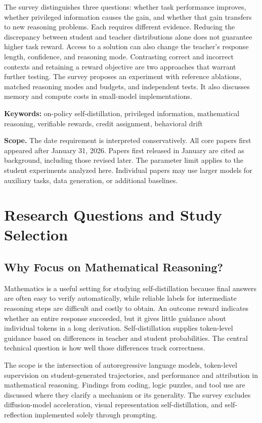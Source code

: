 \documentclass[11pt,a4paper]{article}
\begin{document}
The survey distinguishes three questions: whether task performance improves, whether privileged information causes the gain, and whether that gain transfers to new reasoning problems. Each requires different evidence. Reducing the discrepancy between student and teacher distributions alone does not guarantee higher task reward. Access to a solution can also change the teacher's response length, confidence, and reasoning mode. Contrasting correct and incorrect contexts and retaining a reward objective are two approaches that warrant further testing. The survey proposes an experiment with reference ablations, matched reasoning modes and budgets, and independent tests. It also discusses memory and compute costs in small-model implementations.

\noindent\textbf{Keywords:} on-policy self-distillation, privileged information, mathematical reasoning, verifiable rewards, credit assignment, behavioral drift

\medskip
\noindent\textbf{Scope.} The date requirement is interpreted conservatively. All core papers first appeared after January 31, 2026. Papers first released in January are cited as background, including those revised later. The parameter limit applies to the student experiments analyzed here. Individual papers may use larger models for auxiliary tasks, data generation, or additional baselines.

\clearpage
\tableofcontents
\clearpage
{}

\section{Research Questions and Study Selection}
\subsection{Why Focus on Mathematical Reasoning?}
Mathematics is a useful setting for studying self-distillation because final answers are often easy to verify automatically, while reliable labels for intermediate reasoning steps are difficult and costly to obtain. An outcome reward indicates whether an entire response succeeded, but it gives little guidance about individual tokens in a long derivation. Self-distillation supplies token-level guidance based on differences in teacher and student probabilities. The central technical question is how well those differences track correctness.

The scope is the intersection of autoregressive language models, token-level supervision on student-generated trajectories, and performance and attribution in mathematical reasoning. Findings from coding, logic puzzles, and tool use are discussed where they clarify a mechanism or its generality. The survey excludes diffusion-model acceleration, visual representation self-distillation, and self-reflection implemented solely through prompting.
\end{document}
